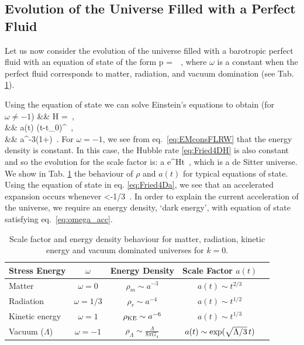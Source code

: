 \subsection{Evolution of the Universe Filled with a Perfect Fluid}

Let us now consider the evolution of the universe filled with a barotropic perfect fluid with an equation of state of the form
 \be
	\label{eq:eos}
 p = \omega\, \rho\,,
 \ee
 where $\omega$ is  a constant when the perfect fluid corresponds to  matter, radiation, and vacuum domination (see Tab. \ref{tab:scalef_evolution}).

Using the equation of state we can solve Einstein's equations to obtain (for $\omega\ne-1$)
\bea\label{eq:FLRWsols}
&& H =  \,, \\
&& a(t) \propto (t-t_0)^{} \,, \\
&& \rho \propto a^{-3(1+\omega)} \,.
\eea
For $\omega =-1$, we see from eq.~\eqref{eq:EMconsFLRW} that the energy density is constant. In this case, the Hubble rate \eqref{eq:Fried4DH} is also constant and so the evolution for the scale factor is:
\be
\label{eq:dSa}
a \propto e^{Ht} \,,
\ee
which is a de Sitter universe. We show in Tab. \ref{tab:scalef_evolution} the behaviour of $\rho$ and $a(t)$ for typical equations of state.
Using the equation of state in eq. \eqref{eq:Fried4Da}, we see that an accelerated expansion occurs  whenever
\be
\label{eq:omega_acc}
\omega <-1/3 \,.
\ee
 In order to explain the current acceleration of the universe, we require an energy density, `dark energy', with equation of state satisfying eq.~\eqref{eq:omega_acc}.

\begin{table}[htbp!]
\begin{center}
\centering
\begin{tabular}{| l | c  | c | c | c | }
\hline
\cellcolor[gray]{0.9}  {\bf Stress Energy} &  \cellcolor[gray]{0.9} {\bf $\omega$ } &  \cellcolor[gray]{0.9} {\bf Energy Density } &  \cellcolor[gray]{0.9} {\bf Scale Factor $a(t)$}   \\
\hline \hline
 Matter   & $\omega =0$ & $\rho_m \sim a^{-3}$ & $a(t) \sim t^{2/3}$  \\
\hline
Radiation & $\omega =1/3$ & $\rho_r \sim a^{-4}$  & $a(t) \sim t^{1/2} $ \\
\hline
Kinetic energy & $\omega = 1$ & $\rho_{\rm KE} \sim a^{-6}$ & $a(t) \sim t^{1/3} $ \\
\hline
 Vacuum ($\Lambda$) & $\omega =-1$    & $\rho_\Lambda \sim \frac{\Lambda}{8\pi G_4}$  & $a(t) \sim {\rm exp}(\sqrt{\Lambda/3} \,t)$    \\
\hline
\end{tabular}
\end{center}
\caption {Scale factor and energy density behaviour for matter, radiation, kinetic energy and vacuum dominated universes for $k=0$.}
\label{tab:scalef_evolution}
\end{table}


